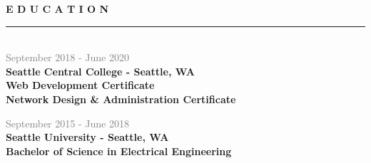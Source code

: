 \documentclass[letterpage]{article}
\begin{document}
\begin{minipage}[t]{0.424\linewidth}
\vspace{0pt}
\textbf{\fontsize{14px}{1px}\selectfont E D U C A T I O N}\\
\noindent\rule{2.45in}{0.1pt}
\vspace{7px}\\
\textcolor{gray}{September 2018 - June 2020}\\
\textbf{\textsf{Seattle Central College - Seattle, WA}}\\
\textbf{Web Development Certificate}\\
\textbf{Network Design \& Administration Certificate}
\vspace{7px}

\textcolor{gray}{September 2015 - June 2018}\\
\textbf{\textsf{Seattle University - Seattle, WA}}\\
\textbf{Bachelor of Science in Electrical Engineering}
\vspace{7px}


\end{minipage}
\end{document}
